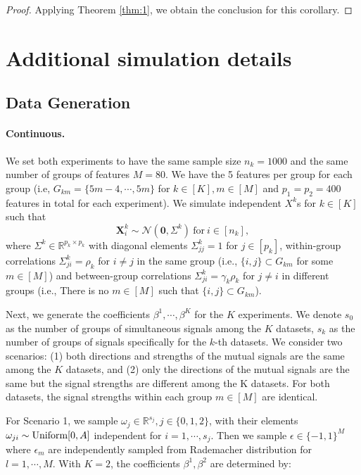 \documentclass[11pt]{article}
\theoremstyle{plain}
\theoremstyle{definition}
\theoremstyle{remark}
\def\R{\mathbb{R}}
\def\R{\mathbb{R}}
\newcommand{\X}{\mathbf{X}}
\newcommand{\0}{\mathbf{0}}
\begin{document}
\begin{proof}
 Applying Theorem \ref{thm:1}, we obtain the conclusion for this corollary.
\end{proof}

\section{Additional simulation details} \label{app:sim}

\subsection{Data Generation}

\paragraph{Continuous.} We set both experiments to have the same sample size $n_k=1000$ and the same number of groups of features $M=80$. We have the 5 features per group for each group (i.e, $G_{km} = \{5m-4, \cdots, 5m\}$ for $k \in [K], m \in [M]$ and $p_1=p_2=400$ features in total for each experiment). We simulate independent $X^k$s for $k \in [K]$ such that
\[\X_i^k \sim \mathcal{N} (\mathbf{0}, \Sigma^{k}) ~\text{for}~ i \in [n_k],\]
where $\Sigma^k \in \R^{p_k \times p_k}$ with diagonal elements $\Sigma_{jj}^{k}=1$ for $j \in [p_k]$, within-group correlations $\Sigma_{ji}^{k}=\rho_{k}$ for $i \neq j$ in the same group (i.e., $\{i,j\}\subset G_{km}$ for some $m\in [M]$) and between-group correlations $\Sigma_{ji}^{k}=\gamma_{k}\rho_{k}$ for $j	
\neq i$ in different groups (i.e., There is no $m\in [M]$ such that $\{i,j\}\subset G_{km}$). 

Next, we generate the coefficients $\beta^1, \cdots,\beta^K$ for the $K$ experiments. %
We denote $s_0$ as the number of groups of simultaneous signals among the $K$ datasets, $s_k$ as the number of groups of signals specifically for the $k$-th datasets. We consider two scenarios: (1) both directions and strengths of the mutual signals are the same among the $K$ datasets, and (2) only the directions of the mutual signals are the same but the signal strengths are different among the K datasets. For both datasets, the signal strengths within each group $m \in [M]$ are identical.

For Scenario 1, we sample $\omega_{j} \in \mathbb{R}^{s_j}, j \in \{0,1,2\}$, with their elements $\omega_{ji}\sim \textnormal{Uniform}[0,A]$ independent for $ i=1,\cdots, s_j$. Then we sample $\epsilon \in \{-1,1\}^M$ where $\epsilon_m$ are independently sampled from Rademacher distribution for $l=1,\cdots,M$. With $K=2$, the coefficients $\beta^1, \beta^2$ are determined by:
\end{document}
